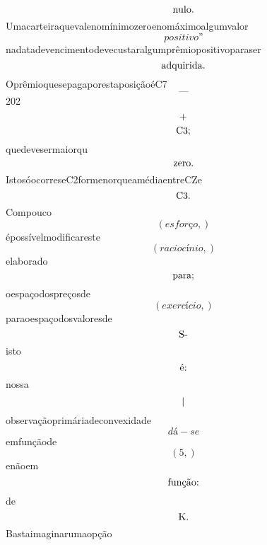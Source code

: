 \documentclass{article}
\begin{document}
\begin{equation}
$nulo.$
\end{equation}Umacarteiraquevalenomínimozeroenomáximoalgumvalor\begin{equation}
positivo”
\end{equation}nadatadevencimentodevecustaralgumprêmiopositivoparaser\begin{equation}
$adquirida.$
\end{equation}OprêmioquesepagaporestaposiçãoéC7\begin{equation}
—
\end{equation}202\begin{equation}
$+$
\end{equation}\begin{equation}
$C3;$
\end{equation}quedevesermaiorqu\begin{equation}
$zero.$
\end{equation}IstosóocorreseC2formenorqueamédiaentreCZe\begin{equation}
$C3.$
\end{equation}Compouco\begin{equation}
\left( esforço,\right)
\end{equation}épossívelmodificareste\begin{equation}
\left( raciocínio,\right)
\end{equation}elaborado\begin{equation}
$para;$
\end{equation}oespaçodospreçosde\begin{equation}
\left( exercício,\right)
\end{equation}paraoespaçodosvaloresde\begin{equation}
$S-$
\end{equation}isto\begin{equation}
$é:$
\end{equation}nossa\begin{equation}
$|$
\end{equation}observaçãoprimáriadeconvexidade\begin{equation}
dá - se
\end{equation}emfunçãode\begin{equation}
\left( 5,\right)
\end{equation}enãoem\begin{equation}
$função:$
\end{equation}de\begin{equation}
$K.$
\end{equation}Bastaimaginarumaopção\begin{equation}

\end{equation}
\end{document}
